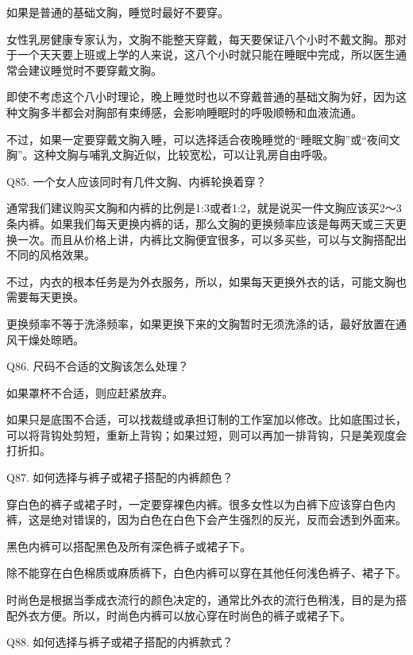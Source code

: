 \documentclass[12pt,UTF8]{ctexbook}
\begin{document}
如果是普通的基础文胸，睡觉时最好不要穿。

女性乳房健康专家认为，文胸不能整天穿戴，每天要保证八个小时不戴文胸。那对于一个天天要上班或上学的人来说，这八个小时就只能在睡眠中完成，所以医生通常会建议睡觉时不要穿戴文胸。

即使不考虑这个八小时理论，晚上睡觉时也以不穿戴普通的基础文胸为好，因为这种文胸多半都会对胸部有束缚感，会影响睡眠时的呼吸顺畅和血液流通。

不过，如果一定要穿戴文胸入睡，可以选择适合夜晚睡觉的“睡眠文胸”或“夜间文胸”。这种文胸与哺乳文胸近似，比较宽松，可以让乳房自由呼吸。





Q85. 一个女人应该同时有几件文胸、内裤轮换着穿？


通常我们建议购买文胸和内裤的比例是1:3或者1:2，就是说买一件文胸应该买2～3条内裤。如果我们每天更换内裤的话，那么文胸的更换频率应该是每两天或三天更换一次。而且从价格上讲，内裤比文胸便宜很多，可以多买些，可以与文胸搭配出不同的风格效果。

不过，内衣的根本任务是为外衣服务，所以，如果每天更换外衣的话，可能文胸也需要每天更换。

更换频率不等于洗涤频率，如果更换下来的文胸暂时无须洗涤的话，最好放置在通风干燥处晾晒。





Q86. 尺码不合适的文胸该怎么处理？


如果罩杯不合适，则应赶紧放弃。

如果只是底围不合适，可以找裁缝或承担订制的工作室加以修改。比如底围过长，可以将背钩处剪短，重新上背钩；如果过短，则可以再加一排背钩，只是美观度会打折扣。





Q87. 如何选择与裤子或裙子搭配的内裤颜色？


穿白色的裤子或裙子时，一定要穿裸色内裤。很多女性以为白裤下应该穿白色内裤，这是绝对错误的，因为白色在白色下会产生强烈的反光，反而会透到外面来。

黑色内裤可以搭配黑色及所有深色裤子或裙子下。

除不能穿在白色棉质或麻质裤下，白色内裤可以穿在其他任何浅色裤子、裙子下。

时尚色是根据当季成衣流行的颜色决定的，通常比外衣的流行色稍浅，目的是为搭配外衣方便。所以，时尚色内裤可以放心穿在时尚色的裤子或裙子下。





Q88. 如何选择与裤子或裙子搭配的内裤款式？
\end{document}
